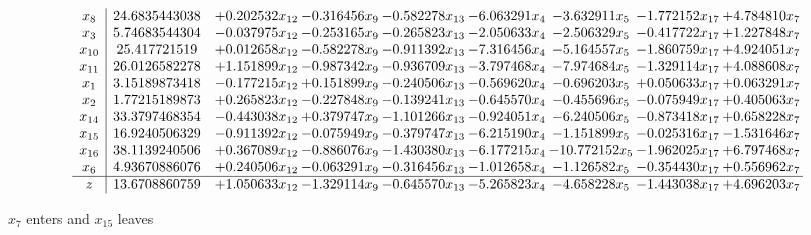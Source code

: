 \documentclass[10pt]{article}
\begin{document}
 \[\begin{array}{c| c c@{\hskip 2pt} c@{\hskip 2pt} c@{\hskip 2pt} c@{\hskip 2pt} c@{\hskip 2pt} c@{\hskip 2pt} c@{\hskip 2pt} }
 x_{8}   &  24.6835443038 & + 0.202532 x_{12} & -0.316456 x_{9} & -0.582278 x_{13} & -6.063291 x_{4} & -3.632911 x_{5} & -1.772152 x_{17} & + 4.784810 x_{7}\\
 x_{3}   &  5.74683544304 & -0.037975 x_{12} & -0.253165 x_{9} & -0.265823 x_{13} & -2.050633 x_{4} & -2.506329 x_{5} & -0.417722 x_{17} & + 1.227848 x_{7}\\
 x_{10}   &  25.417721519 & + 0.012658 x_{12} & -0.582278 x_{9} & -0.911392 x_{13} & -7.316456 x_{4} & -5.164557 x_{5} & -1.860759 x_{17} & + 4.924051 x_{7}\\
 x_{11}   &  26.0126582278 & + 1.151899 x_{12} & -0.987342 x_{9} & -0.936709 x_{13} & -3.797468 x_{4} & -7.974684 x_{5} & -1.329114 x_{17} & + 4.088608 x_{7}\\
 x_{1}   &  3.15189873418 & -0.177215 x_{12} & + 0.151899 x_{9} & -0.240506 x_{13} & -0.569620 x_{4} & -0.696203 x_{5} & + 0.050633 x_{17} & + 0.063291 x_{7}\\
 x_{2}   &  1.77215189873 & + 0.265823 x_{12} & -0.227848 x_{9} & -0.139241 x_{13} & -0.645570 x_{4} & -0.455696 x_{5} & -0.075949 x_{17} & + 0.405063 x_{7}\\
 x_{14}   &  33.3797468354 & -0.443038 x_{12} & + 0.379747 x_{9} & -1.101266 x_{13} & -0.924051 x_{4} & -6.240506 x_{5} & -0.873418 x_{17} & + 0.658228 x_{7}\\
 x_{15}   &  16.9240506329 & -0.911392 x_{12} & -0.075949 x_{9} & -0.379747 x_{13} & -6.215190 x_{4} & -1.151899 x_{5} & -0.025316 x_{17} & -1.531646 x_{7}\\
 x_{16}   &  38.1139240506 & + 0.367089 x_{12} & -0.886076 x_{9} & -1.430380 x_{13} & -6.177215 x_{4} & -10.772152 x_{5} & -1.962025 x_{17} & + 6.797468 x_{7}\\
 x_{6}   &  4.93670886076 & + 0.240506 x_{12} & -0.063291 x_{9} & -0.316456 x_{13} & -1.012658 x_{4} & -1.126582 x_{5} & -0.354430 x_{17} & + 0.556962 x_{7}\\
\hline
z    &  13.6708860759 & + 1.050633 x_{12} & -1.329114 x_{9} & -0.645570 x_{13} & -5.265823 x_{4} & -4.658228 x_{5} & -1.443038 x_{17} & + 4.696203 x_{7}\\
\end{array}\]


 $ x_{7} $ enters and $ x_{15} $ leaves 
\end{document}

